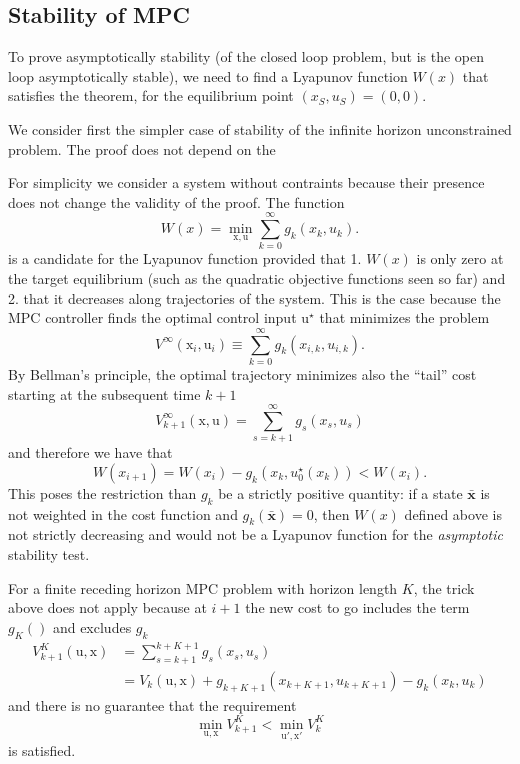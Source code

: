 \documentclass[11pt]{report}
\newcommand{\bs}[1]{\boldsymbol{#1}}
\newcommand{\bsu}{\bs{\mathrm{u}}}
\newcommand{\bsx}{\bs{\mathrm{x}}}
\begin{document}
\subsection{Stability of MPC}
\label{sec:stability-MPC}

To prove asymptotically stability (of the closed loop problem, but is the open loop asymptotically stable), we need to find a Lyapunov function $W(x)$ that satisfies the theorem, for the equilibrium point $(x_S,u_S)=(0,0)$.

We consider first the simpler case of stability of the infinite horizon unconstrained problem. The proof does not depend on the

For simplicity we consider a system without contraints because their presence does not change the validity of the proof. The function
\begin{equation*}
  W(x) = \min_{\bsx,\bsu} \sum_{k=0}^\infty g_k(x_k,u_k).
\end{equation*}
is a candidate for the Lyapunov function provided that 1. $W(x)$ is only zero at the target equilibrium (such as the quadratic objective functions seen so far) and 2. that it decreases along trajectories of the system. This is the case because the MPC controller finds the optimal control input $\bsu^\star$ that minimizes the problem
\begin{equation*}
  V^\infty(\bsx_i,\bsu_i) \equiv \sum_{k=0}^\infty g_k(x_{i,k},u_{i,k}).
\end{equation*}
By Bellman's principle, the optimal trajectory minimizes also the ``tail'' cost starting at the subsequent time $k+1$
\begin{equation*}
  V_{k+1}^\infty(\bsx,\bsu) = \sum_{s=k+1}^\infty g_s(x_s,u_s)
\end{equation*}
and therefore we have that
\begin{equation*}
  W(x_{i+1}) = W(x_i) - g_k(x_k,u_0^\star(x_k)) < W(x_i).
\end{equation*}
This poses the restriction than $g_k$ be a strictly positive quantity: if a state $\bs{\bar{x}}$ is not weighted in the cost function and $g_k(\bs{\bar{x}})=0$, then $W(x)$ defined above is not strictly decreasing and would not be a Lyapunov function for the \emph{asymptotic} stability test.

For a finite receding horizon MPC problem with horizon length $K$, the trick above does not apply because at $i+1$ the new cost to go includes the term $g_{K}()$ and excludes $g_k$
\begin{align*}
  V^K_{k+1}(\bsu,\bsx) &= \sum_{s=k+1}^{k+K+1}g_s(x_s,u_s) \\
                       &= V_k(\bsu,\bsx) + g_{k+K+1}(x_{k+K+1},u_{k+K+1}) - g_k(x_k,u_k)
\end{align*}
and there is no guarantee that the requirement
\begin{equation*}
  \min_{\bsu,\bsx} V^K_{k+1} < \min_{\bsu',\bsx'} V^K_k
\end{equation*}
is satisfied.
\end{document}
